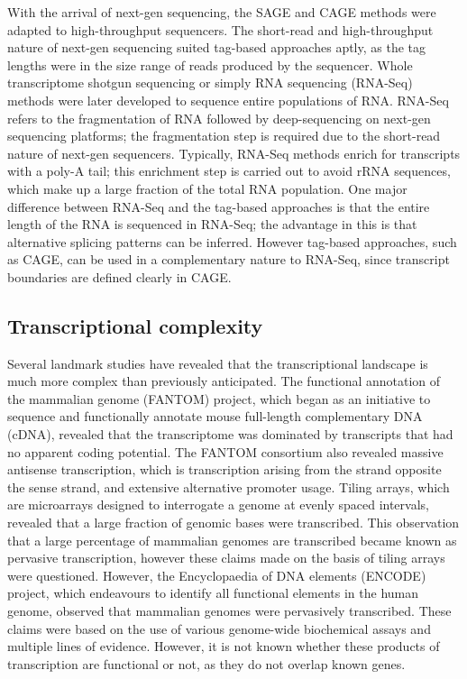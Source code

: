 With the arrival of next-gen sequencing, the SAGE and CAGE methods were adapted to high-throughput sequencers\cite{pmid14676315,Takahashi2012}. The short-read and high-throughput nature of next-gen sequencing suited tag-based approaches aptly, as the tag lengths were in the size range of reads produced by the sequencer. Whole transcriptome shotgun sequencing or simply RNA sequencing (RNA-Seq) methods were later developed to sequence entire populations of RNA. RNA-Seq refers to the fragmentation of RNA followed by deep-sequencing on next-gen sequencing platforms\cite{pmid19015660}; the fragmentation step is required due to the short-read nature of next-gen sequencers. Typically, RNA-Seq methods enrich for transcripts with a poly-A tail; this enrichment step is carried out to avoid rRNA sequences, which make up a large fraction of the total RNA population. One major difference between RNA-Seq and the tag-based approaches is that the entire length of the RNA is sequenced in RNA-Seq; the advantage in this is that alternative splicing patterns can be inferred. However tag-based approaches, such as CAGE, can be used in a complementary nature to RNA-Seq\cite{pmid24676093}, since transcript boundaries are defined clearly in CAGE.

\subsection{Transcriptional complexity}

Several landmark studies have revealed that the transcriptional landscape is much more complex than previously anticipated. The functional annotation of the mammalian genome (FANTOM) project, which began as an initiative to sequence and functionally annotate mouse full-length complementary DNA (cDNA)\cite{pmid11217851}, revealed that the transcriptome was dominated by transcripts that had no apparent coding potential\cite{pmid12466851}. The FANTOM consortium also revealed massive antisense transcription\cite{pmid16141073}, which is transcription arising from the strand opposite the sense strand, and extensive alternative promoter usage\cite{pmid16141072}. Tiling arrays, which are microarrays designed to interrogate a genome at evenly spaced intervals, revealed that a large fraction of genomic bases were transcribed\cite{pmid15539566, pmid11988577, pmid15790807}. This observation that a large percentage of mammalian genomes are transcribed became known as pervasive transcription\cite{pmid17510325}, however these claims made on the basis of tiling arrays were questioned\cite{pmid20502517}. However, the Encyclopaedia of DNA elements (ENCODE) project, which endeavours to identify all functional elements in the human genome, observed that mammalian genomes were pervasively transcribed\cite{pmid17571346, pmid22955616}. These claims were based on the use of various genome-wide biochemical assays and multiple lines of evidence. However, it is not known whether these products of transcription are functional or not, as they do not overlap known genes.

